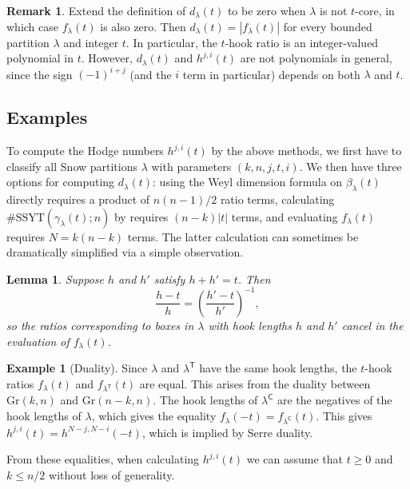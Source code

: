 \documentclass{amsart}
\newcommand\C{\mathsf{C}}
\newcommand\T{\mathsf{T}}
\newcommand\SSYT{\mathrm{SSYT}}
\newcommand\Gr{\mathrm{Gr}}
\theoremstyle{plain}
\newtheorem{lemma}[lemma]{Lemma}
\theoremstyle{definition}
\newtheorem{example}[example]{Example}
\newtheorem{remark}[remark]{Remark}
\numberwithin{equation}{section}
\begin{document}
\begin{remark}\label{rmk:integer-valued}
Extend the definition of $d_\lambda(t)$ to be zero when $\lambda$ is not $t$-core, in which case $f_\lambda(t)$ is also zero. Then $d_\lambda(t)=|f_\lambda(t)|$ for every bounded partition $\lambda$ and integer $t$. In particular, the $t$-hook ratio is an integer-valued polynomial in $t$. However, $d_\lambda(t)$ and $h^{j,i}(t)$ are not polynomials in general, since the sign $(-1)^{i+j}$ (and the $i$ term in particular) depends on both $\lambda$ and $t$.
\end{remark}


\subsection{Examples}\label{sec:examples}

To compute the Hodge numbers $h^{j,i}(t)$ by the above methods, we first have to classify all Snow partitions $\lambda$ with parameters $(k,n,j,t,i)$. We then have three options for computing $d_\lambda(t)$: using the Weyl dimension formula on $\beta_\lambda(t)$ directly requires a product of $n(n-1)/2$ ratio terms, calculating $\#\SSYT(\gamma_\lambda(t);n)$ by  requires $(n-k)|t|$ terms, and evaluating $f_\lambda(t)$ requires $N=k(n-k)$ terms. The latter calculation can sometimes be dramatically simplified via a simple observation.

\begin{lemma}\label{lem:h+h'}
Suppose $h$ and $h'$ satisfy $h+h'=t$. Then
\[\frac{h-t}{h}=\left(\frac{h'-t}{h'}\right)^{-1},\]
so the ratios corresponding to boxes in $\lambda$ with hook lengths $h$ and $h'$ cancel in the evaluation of $f_\lambda(t)$.
\end{lemma}

\begin{example}[Duality]
Since $\lambda$ and $\lambda^\T$ have the same hook lengths, the $t$-hook ratios $f_\lambda(t)$ and $f_{\lambda^\T}(t)$ are equal. This arises from the duality between $\Gr(k,n)$ and $\Gr(n-k,n)$. The hook lengths of $\lambda^\C$ are the negatives of the hook lengths of $\lambda$, which gives the equality $f_\lambda(-t)=f_{\lambda^\C}(t)$. This gives $h^{j,i}(t)=h^{N-j,N-i}(-t)$, which is implied by Serre duality.

From these equalities, when calculating $h^{j,i}(t)$ we can assume that $t\geq 0$ and $k\leq n/2$ without loss of generality.
\end{example}
\end{document}

